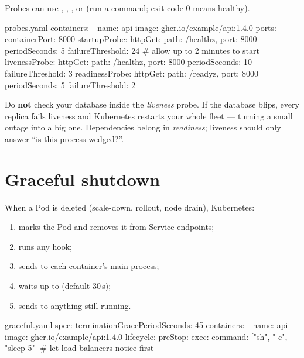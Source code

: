 Probes can use , , , or  (run a
command; exit code 0 means healthy).

\begin{yamlcode}{probes.yaml}
containers:
  - name: api
    image: ghcr.io/example/api:1.4.0
    ports:
      - containerPort: 8000
    startupProbe:
      httpGet: { path: /healthz, port: 8000 }
      periodSeconds: 5
      failureThreshold: 24       # allow up to 2 minutes to start
    livenessProbe:
      httpGet: { path: /healthz, port: 8000 }
      periodSeconds: 10
      failureThreshold: 3
    readinessProbe:
      httpGet: { path: /readyz, port: 8000 }
      periodSeconds: 5
      failureThreshold: 2
\end{yamlcode}

\begin{warningbox}
Do \textbf{not} check your database inside the \emph{liveness} probe. If the
database blips, every replica fails liveness and Kubernetes restarts your whole
fleet --- turning a small outage into a big one. Dependencies belong in
\emph{readiness}; liveness should only answer ``is this process wedged?''.
\end{warningbox}

\section{Graceful shutdown}

When a Pod is deleted (scale-down, rollout, node drain), Kubernetes:

\begin{enumerate}
  \item marks the Pod  and removes it from Service endpoints;
  \item runs any  hook;
  \item sends  to each container's main process;
  \item waits up to  (default 30\,s);
  \item sends  to anything still running.
\end{enumerate}

\begin{yamlcode}{graceful.yaml}
spec:
  terminationGracePeriodSeconds: 45
  containers:
    - name: api
      image: ghcr.io/example/api:1.4.0
      lifecycle:
        preStop:
          exec:
            command: ["sh", "-c", "sleep 5"]   # let load balancers notice first
\end{yamlcode}

